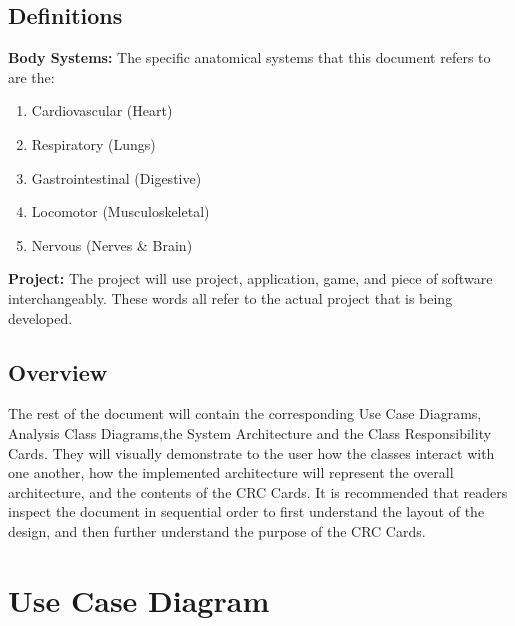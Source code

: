 \documentclass[]{article}
\begin{document}
\subsection{Definitions}
\label{sub:system_description}

\hspace{5mm}\textbf{Body Systems:} The specific anatomical systems that this document refers to are the:
\begin{enumerate}
	\item Cardiovascular (Heart)
	\item Respiratory (Lungs)
	\item Gastrointestinal (Digestive)
	\item Locomotor (Musculoskeletal)
	\item Nervous (Nerves \& Brain)
\end{enumerate} 

\vspace{5mm}

\textbf{Project:} The project will use project, application, game, and piece of software interchangeably.
These words all refer to the actual project that is being developed.

\subsection{Overview}
\label{sub:overview}
The rest of the document will contain the corresponding Use Case Diagrams,
Analysis Class Diagrams,the System Architecture and the Class Responsibility Cards.
They will visually demonstrate to the user how the classes interact with one another,
how the implemented architecture will represent the overall architecture,
and the contents of the CRC Cards. It is recommended that readers inspect the
document in sequential order to first understand the layout of the design, and then
further understand the purpose of the CRC Cards.




\section{Use Case Diagram}
\label{sec:use_case_diagram}
\noindent{}
\end{document}
